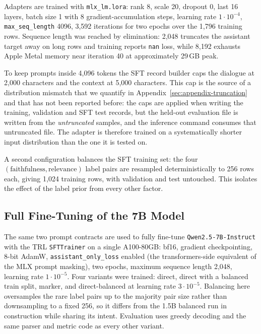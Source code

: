 \documentclass{zapiski}
\begin{document}
Adapters are trained with \texttt{mlx\_lm.lora}: rank 8, scale 20, dropout 0,
last 16 layers, batch size 1 with 8 gradient-accumulation steps, learning rate
$1\cdot10^{-4}$, \texttt{max\_seq\_length} 4096, 3,592 iterations for two
epochs over the 1,796 training rows. Sequence length was reached by
elimination: 2,048 truncates the assistant target away on long rows and
training reports \texttt{nan} loss, while 8,192 exhausts Apple Metal memory
near iteration 40 at approximately 29\,GB peak.

To keep prompts inside 4,096 tokens the SFT record builder caps the dialogue
at 2,000 characters and the context at 5,000 characters. This cap is the
source of a distribution mismatch that we quantify in
Appendix~\ref{sec:appendix-truncation} and that has not been reported before:
the caps are applied when writing the training, validation and SFT test
records, but the held-out evaluation file is written from the
\emph{untruncated} samples, and the inference command consumes that
untruncated file. The adapter is therefore trained on a systematically shorter
input distribution than the one it is tested on.

A second configuration balances the SFT training set: the four
$(\mathrm{faithfulness}, \mathrm{relevance})$ label pairs are resampled
deterministically to 256 rows each, giving 1,024 training rows, with
validation and test untouched. This isolates the effect of the label prior
from every other factor.

\subsection{Full Fine-Tuning of the 7B Model}
\label{sec:fullft}

The same two prompt contracts are used to fully fine-tune
\texttt{Qwen2.5-7B-Instruct} with the TRL \texttt{SFTTrainer} on a single
A100-80GB: bf16, gradient checkpointing, 8-bit AdamW,
\texttt{assistant\_only\_loss} enabled (the transformers-side equivalent of
the MLX prompt masking), two epochs, maximum sequence length 2,048, learning
rate $1\cdot10^{-5}$. Four variants were trained: direct, direct with a
balanced train split, marker, and direct-balanced at learning rate
$3\cdot10^{-5}$. Balancing here oversamples the rare label pairs up to the
majority pair size rather than downsampling to a fixed 256, so it differs from
the 1.5B balanced run in construction while sharing its intent. Evaluation
uses greedy decoding and the same parser and metric code as every other
variant.
\end{document}
